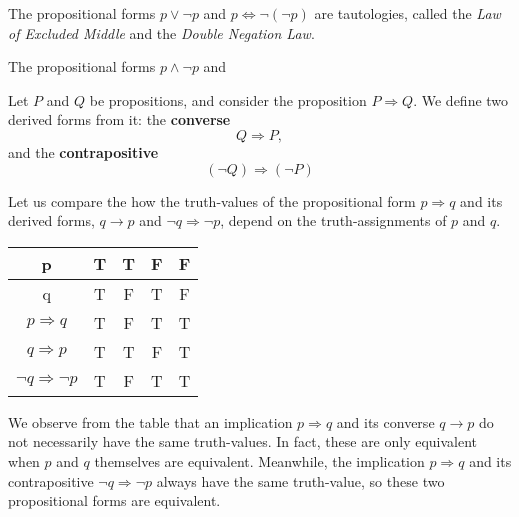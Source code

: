 \begin{example}
The propositional forms $p \lor \neg p$ and $p \Leftrightarrow \neg(\neg p)$ are tautologies, called the \textit{Law of Excluded Middle} and the \textit{Double Negation Law}.
\end{example}

\begin{example}
The propositional forms $p \land \neg p$ and 

\end{example}

\begin{definition}
Let $P$ and $Q$ be propositions, and consider the proposition $P \Rightarrow Q$. We define two derived forms from it: the \textbf{converse}
\begin{equation*}
Q \Rightarrow P,
\end{equation*}
and the \textbf{contrapositive}
\begin{equation*}
(\neg Q) \Rightarrow (\neg P)
\end{equation*}
\end{definition}

Let us compare the how the truth-values of the propositional form $p \Rightarrow q$ and its derived forms, $q \rightarrow p$ and $\neg q \Rightarrow \neg p$, depend on the truth-assignments of $p$ and $q$. 
\begin{center}
\begin{tabular}{|c|c|c|c|c|}
\hline 
\rule[-1ex]{0pt}{2.5ex} p & T & T & F & F \\ 
\hline 
\rule[-1ex]{0pt}{2.5ex} q & T & F & T & F \\ 
\hline 
\rule[-1ex]{0pt}{2.5ex} $p \Rightarrow q$ & T & F & T & T \\ 
\hline 
\rule[-1ex]{0pt}{2.5ex} $q \Rightarrow p$ & T & T & F & T \\ 
\hline 
\rule[-1ex]{0pt}{2.5ex} $ \neg q \Rightarrow \neg p$ & T & F & T & T \\ 
\hline 
\end{tabular} 
\end{center}

We observe from the table that an implication $p \Rightarrow q$ and its converse $q \rightarrow p$ do not necessarily have the same truth-values. In fact, these are only equivalent when $p$ and $q$ themselves are equivalent. Meanwhile, the implication $p \Rightarrow q$ and its contrapositive $\neg q \Rightarrow \neg p$ always have the same truth-value, so these two propositional forms are equivalent. 

